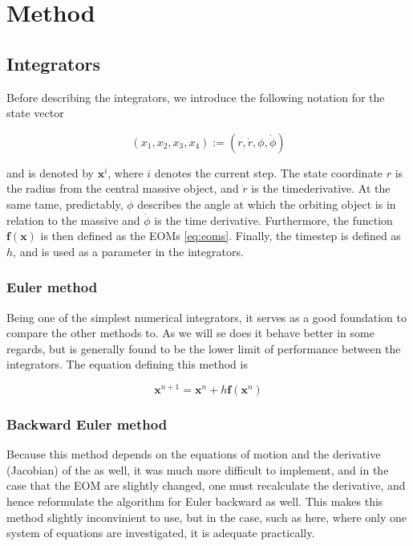 \section{Method}\label{sec:method}

\subsection{Integrators}

Before describing the integrators, we introduce the following notation for the state vector

\begin{equation}
	(x_1, x_2, x_3, x_4) := (r, \dot{r}, \phi, \dot{\phi})
\end{equation}

and is denoted by $\textbf{x}^i$, where $i$ denotes the current step. The state coordinate $r$ is the radius from the central massive object, and $\dot{{r}}$ is the timederivative. At the same tame, predictably, $\phi$ describes the angle at which the orbiting object is in relation to the massive and $\dot{\phi}$ is the time derivative. Furthermore, the function $\textbf{f}(\textbf{x})$ is then defined as the EOMs \eqref{eq:eoms}. Finally, the timestep is defined as $h$, and is used as a parameter in the integrators.  

\subsubsection{Euler method}
Being one of the simplest numerical integrators, it serves as a good foundation to compare the other methods to. As we will se does it behave better in some regards, but is generally found to be the lower limit of performance between the integrators. The equation defining this method is

\begin{equation}\label{eq:euler-method-equation}
	\textbf{x}^{n+1} = \textbf{x}^n + h \textbf{f}(\textbf{x}^n) 
\end{equation}


\subsubsection{Backward Euler method}

Because this method depends on the equations of motion and the derivative (Jacobian) of the as well, it was much more difficult to implement, and in the case that the EOM are slightly changed, one must recalculate the derivative, and hence reformulate the algorithm for Euler backward as well. This makes this method slightly inconvinient to use, but in the case, such as here, where only one system of equations are investigated, it is adequate practically. 

